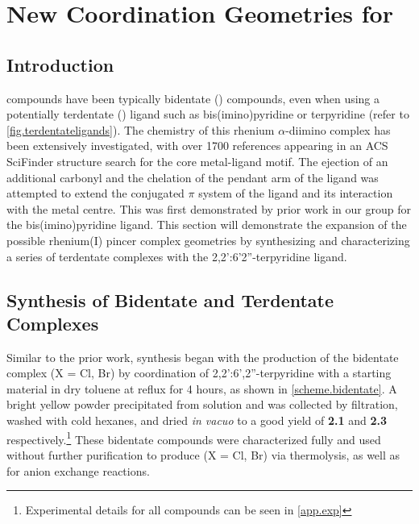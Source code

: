 \chapter{New Coordination Geometries for \texorpdfstring{}{Rhenium (I)}}\label{chap.newchem}
\section{Introduction}

 compounds have been typically bidentate () compounds, even when using a potentially terdentate () ligand such as bis(imino)pyridine or terpyridine (refer to \autoref{fig.terdentateligands}). The chemistry of this rhenium $\alpha$-diimino complex has been extensively investigated, with over 1700 references appearing in an ACS SciFinder structure search for the core metal-ligand motif\autocite{scifinder}. The ejection of an additional carbonyl and the chelation of the pendant arm of the ligand was attempted to extend the conjugated $\pi$ system of the ligand and its interaction with the metal centre. This was first demonstrated by prior work in our group for the bis(imino)pyridine ligand\autocite{jurca2013}. This section will demonstrate the expansion of the possible rhenium(I) pincer complex geometries by synthesizing and characterizing a series of terdentate complexes with the 2,2':6'2''-terpyridine ligand.

\section{Synthesis of Bidentate and Terdentate \texorpdfstring{}{Rhenium (I)} Complexes}

Similar to the prior work, synthesis began with the production of the bidentate complex  (X = Cl, Br) by coordination of 2,2':6',2''-terpyridine with a  starting material in dry toluene at reflux for 4 hours, as shown in \autoref{scheme.bidentate}. A bright yellow powder precipitated from solution and was collected by filtration, washed with cold hexanes, and dried \textit{in vacuo} to a good yield of \textbf{2.1} and \textbf{2.3} respectively.\footnote{Experimental details for all compounds can be seen in \autoref{app.exp} } These bidentate compounds were characterized fully and used without further purification to produce  (X = Cl, Br) via thermolysis, as well as for anion exchange reactions. 

